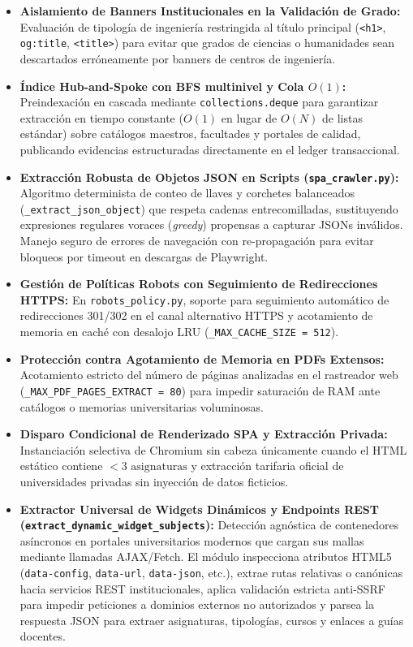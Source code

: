 \begin{itemize}
    \item \textbf{Aislamiento de Banners Institucionales en la Validación de Grado:} Evaluación de tipología de ingeniería restringida al título principal (\texttt{<h1>}, \texttt{og:title}, \texttt{<title>}) para evitar que grados de ciencias o humanidades sean descartados erróneamente por banners de centros de ingeniería.
    \item \textbf{Índice Hub-and-Spoke con BFS multinivel y Cola $O(1)$:} Preindexación en cascada mediante \texttt{collections.deque} para garantizar extracción en tiempo constante ($O(1)$ en lugar de $O(N)$ de listas estándar) sobre catálogos maestros, facultades y portales de calidad, publicando evidencias estructuradas directamente en el ledger transaccional.
    \item \textbf{Extracción Robusta de Objetos JSON en Scripts (\texttt{spa\_crawler.py}):} Algoritmo determinista de conteo de llaves y corchetes balanceados (\texttt{\_extract\_json\_object}) que respeta cadenas entrecomilladas, sustituyendo expresiones regulares voraces (\emph{greedy}) propensas a capturar JSONs inválidos. Manejo seguro de errores de navegación con re-propagación para evitar bloqueos por timeout en descargas de Playwright.
    \item \textbf{Gestión de Políticas Robots con Seguimiento de Redirecciones HTTPS:} En \texttt{robots\_policy.py}, soporte para seguimiento automático de redirecciones 301/302 en el canal alternativo HTTPS y acotamiento de memoria en caché con desalojo LRU (\texttt{\_MAX\_CACHE\_SIZE = 512}).
    \item \textbf{Protección contra Agotamiento de Memoria en PDFs Extensos:} Acotamiento estricto del número de páginas analizadas en el rastreador web (\texttt{\_MAX\_PDF\_PAGES\_EXTRACT = 80}) para impedir saturación de RAM ante catálogos o memorias universitarias voluminosas.
    \item \textbf{Disparo Condicional de Renderizado SPA y Extracción Privada:} Instanciación selectiva de Chromium sin cabeza únicamente cuando el HTML estático contiene $< 3\text{ asignaturas}$ y extracción tarifaria oficial de universidades privadas sin inyección de datos ficticios.
    \item \textbf{Extractor Universal de Widgets Dinámicos y Endpoints REST (\texttt{extract\_dynamic\_widget\_subjects}):} Detección agnóstica de contenedores asíncronos en portales universitarios modernos que cargan sus mallas mediante llamadas AJAX/Fetch. El módulo inspecciona atributos HTML5 (\texttt{data-config}, \texttt{data-url}, \texttt{data-json}, etc.), extrae rutas relativas o canónicas hacia servicios REST institucionales, aplica validación estricta anti-SSRF para impedir peticiones a dominios externos no autorizados y parsea la respuesta JSON para extraer asignaturas, tipologías, cursos y enlaces a guías docentes.

\end{itemize}
